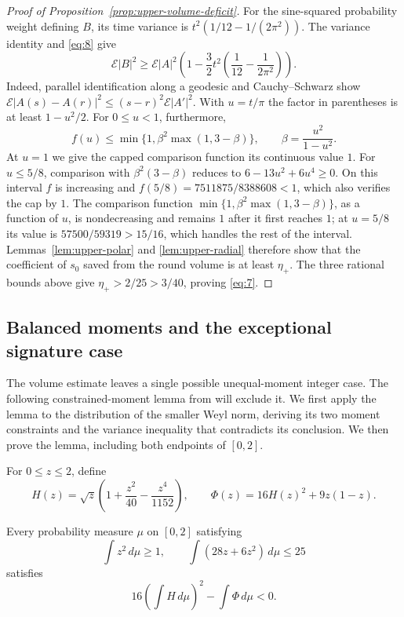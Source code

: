 \begin{proof}[Proof of Proposition~\ref{prop:upper-volume-deficit}]
For the sine-squared probability weight defining $B$, its time variance
is $t^2(1/12-1/(2\pi^2))$.  The variance identity and \eqref{eq:8} give
\[
 \mathcal E|B|^2\ge\mathcal E|A|^2
 \left(1-\frac32t^2\left(\frac1{12}-\frac1{2\pi^2}\right)\right).
\]
Indeed, parallel identification along a geodesic and Cauchy--Schwarz
show
$\mathcal E|A(s)-A(r)|^2\le(s-r)^2\mathcal E|A'|^2$.
With $u=t/\pi$ the factor in parentheses is at least $1-u^2/2$.
For $0\le u<1$, furthermore,
\[
 f(u)\le\min\{1,\beta^2\max(1,3-\beta)\},\qquad
 \beta=\frac{u^2}{1-u^2}.
\]
At $u=1$ we give the capped comparison function its continuous value $1$.
For $u\le5/8$, comparison with $\beta^2(3-\beta)$ reduces to
$6-13u^2+6u^4\ge0$. On this interval $f$ is increasing and
$f(5/8)=7511875/8388608<1$, which also verifies the cap by $1$.  The comparison function $\min\{1,\beta^2\max(1,3-\beta)\}$, as a function of $u$, is nondecreasing and remains $1$ after it first reaches $1$; at $u=5/8$ its value is
$57500/59319>15/16$, which handles the rest of the interval.
Lemmas~\ref{lem:upper-polar} and \ref{lem:upper-radial} therefore show
that the coefficient of $s_0$ saved from the round volume is at least
$\eta_+$. The three rational bounds above give $\eta_+>2/25>3/40$,
proving \eqref{eq:7}.

\end{proof}

\subsection{Balanced moments and the exceptional signature case}

The volume estimate leaves a single possible unequal-moment integer
case. The following constrained-moment lemma from
\cite[Lemma~4.8]{OpenAI2026P} will exclude it. We first apply the lemma
to the distribution of the smaller Weyl norm, deriving its two moment
constraints and the variance inequality that contradicts its conclusion.
We then prove the lemma, including both endpoints of $[0,2]$.

For $0\le z\le2$, define
\[
 H(z)=\sqrt z\left(1+\frac{z^2}{40}-\frac{z^4}{1152}\right),\qquad
 \Phi(z)=16H(z)^2+9z(1-z).
\]

\begin{lemma}\label{lem:moment-obstruction}
Every probability measure $\mu$ on $[0,2]$ satisfying
\[
 \int z^2\,d\mu\ge1,\qquad
 \int(28z+6z^2)\,d\mu\le25
\]
satisfies
\[
 16\left(\int H\,d\mu\right)^2-\int\Phi\,d\mu<0.
\]
\end{lemma}

